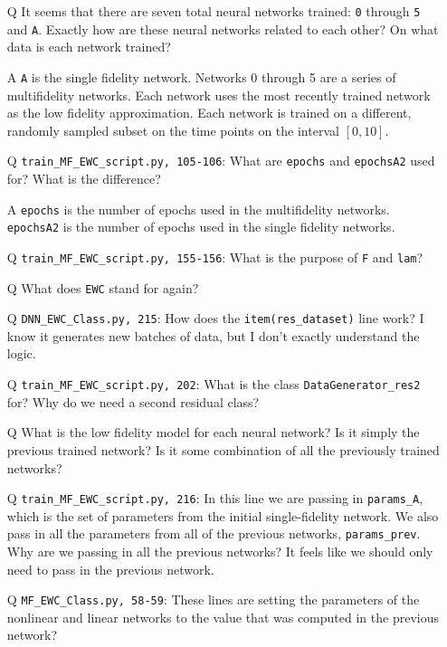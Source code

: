 \documentclass{article}
\begin{document}
\begin{itemize}
	\item[Q] It seems that there are seven total neural networks trained: \verb|0| through \verb|5| and \verb|A|. Exactly how are these neural networks related to each other? On what data is each network trained?
	\item[A] \verb|A| is the single fidelity network. Networks 0 through 5 are a series of multifidelity networks. Each network uses the most recently trained network as the low fidelity approximation. Each network is trained on a different, randomly sampled subset on the time points on the interval $[0,10]$. 
	\item[Q] \verb|train_MF_EWC_script.py, 105-106|: What are \verb|epochs| and \verb|epochsA2| used for? What is the difference?
	\item[A] \verb|epochs| is the number of epochs used in the multifidelity networks. \verb|epochsA2| is the number of epochs used in the single fidelity networks.
	\item[Q] \verb|train_MF_EWC_script.py, 155-156|: What is the purpose of \verb|F| and \verb|lam|?
	\item[Q] What does \verb|EWC| stand for again?
	\item[Q] \verb|DNN_EWC_Class.py, 215|: How does the \verb|item(res_dataset)| line work? I know it generates new batches of data, but I don't exactly understand the logic.
	\item[Q] \verb|train_MF_EWC_script.py, 202|: What is the class \verb|DataGenerator_res2| for? Why do we need a second residual class?
	\item[Q] What is the low fidelity model for each neural network? Is it simply the previous trained network? Is it some combination of all the previously trained networks?
	\item[Q] \verb|train_MF_EWC_script.py, 216|: In this line we are passing in \verb|params_A|, which is the set of parameters from the initial single-fidelity network. We also pass in all the parameters from all of the previous networks, \verb|params_prev|. Why are we passing in all the previous networks? It feels like we should only need to pass in the previous network.
	\item[Q] \verb|MF_EWC_Class.py, 58-59|: These lines are setting the parameters of the nonlinear and linear networks to the value that was computed in the previous network?
\end{itemize}
\end{document}
